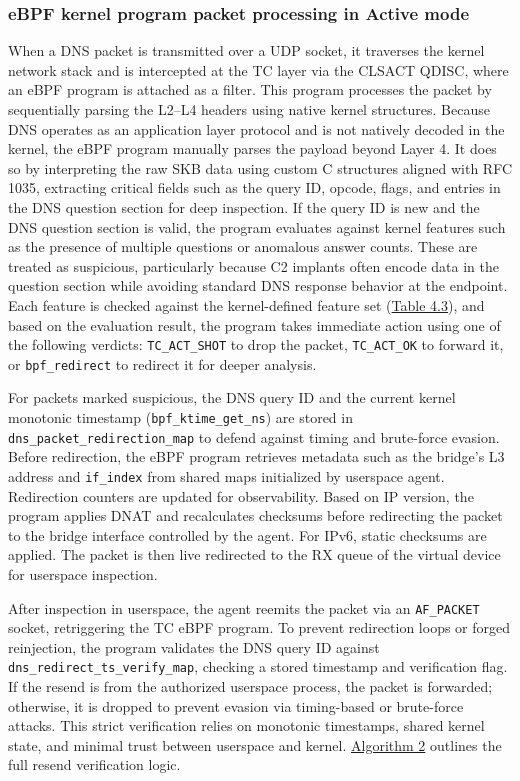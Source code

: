 \documentclass [11pt, proquest] {uwthesis}[2020/02/24]
\begin{document}
\subsubsection{\textbf{eBPF kernel program packet processing in \textbf{Active} mode}}
\label{active:sec1}
When a DNS packet is transmitted over a UDP socket, it traverses the kernel network stack and is intercepted at the TC layer via the CLSACT QDISC, where an eBPF program is attached as a filter. This program processes the packet by sequentially parsing the L2–L4 headers using native kernel structures. Because DNS operates as an application layer protocol and is not natively decoded in the kernel, the eBPF program manually parses the payload beyond Layer 4. It does so by interpreting the raw SKB data using custom C structures aligned with RFC 1035, extracting critical fields such as the query ID, opcode, flags, and entries in the DNS question section for deep inspection.
If the query ID is new and the DNS question section is valid, the program evaluates against kernel features such as the presence of multiple questions or anomalous answer counts. These are treated as suspicious, particularly because C2 implants often encode data in the question section while avoiding standard DNS response behavior at the endpoint. Each feature is checked against the kernel-defined feature set (\hyperref[sec:feature-kernel]{Table 4.3}), and based on the evaluation result, the program takes immediate action using one of the following verdicts: \texttt{TC\_ACT\_SHOT} to drop the packet, \texttt{TC\_ACT\_OK} to forward it, or \texttt{bpf\_redirect} to redirect it for deeper analysis.

For packets marked suspicious, the DNS query ID and the current kernel monotonic timestamp (\texttt{bpf\_ktime\_get\_ns}) are stored in \texttt{dns\_packet\_redirection\_map} to defend against timing and brute-force evasion. Before redirection, the eBPF program retrieves metadata such as the bridge’s L3 address and \texttt{if\_index} from shared maps initialized by userspace agent. Redirection counters are updated for observability. Based on IP version, the program applies DNAT and recalculates checksums before redirecting the packet to the bridge interface controlled by the agent. For IPv6, static checksums are applied. The packet is then live redirected to the RX queue of the virtual device for userspace inspection.

After inspection in userspace, the agent reemits the packet via an \texttt{AF\_PACKET} socket, retriggering the TC eBPF program. To prevent redirection loops or forged reinjection, the program validates the DNS query ID against \texttt{dns\_redirect\_ts\_verify\_map}, checking a stored timestamp and verification flag. If the resend is from the authorized userspace process, the packet is forwarded; otherwise, it is dropped to prevent evasion via timing-based or brute-force attacks. This strict verification relies on monotonic timestamps, shared kernel state, and minimal trust between userspace and kernel. \hyperref[sec:alg2]{Algorithm 2} outlines the full resend verification logic.
\end{document}
